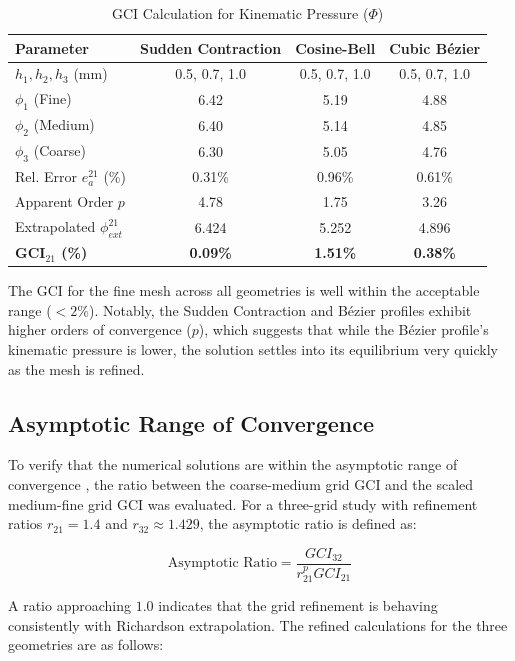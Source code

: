 \documentclass[12pt, a4paper]{article}
\begin{document}
\begin{table}[H]
	\centering
	\caption{GCI Calculation for Kinematic Pressure ($\Phi$)}
	\label{tab:gci_rigorous}
	\begin{tabular}{lccc}
		\toprule
		\textbf{Parameter} & \textbf{Sudden Contraction} & \textbf{Cosine-Bell} & \textbf{Cubic Bézier} \\ \midrule
		$h_1, h_2, h_3$ (mm) & 0.5, 0.7, 1.0 & 0.5, 0.7, 1.0 & 0.5, 0.7, 1.0 \\
		$\phi_1$ (Fine) & 6.42 & 5.19 & 4.88 \\
		$\phi_2$ (Medium) & 6.40 & 5.14 & 4.85 \\
		$\phi_3$ (Coarse) & 6.30 & 5.05 & 4.76 \\
		Rel. Error $e_a^{21}$ (\%) & 0.31\% & 0.96\% & 0.61\% \\
		Apparent Order $p$ & 4.78 & 1.75 & 3.26 \\
		Extrapolated $\phi_{ext}^{21}$ & 6.424 & 5.252 & 4.896 \\
		\textbf{GCI$_{21}$ (\%)} & \textbf{0.09\%} & \textbf{1.51\%} & \textbf{0.38\%} \\ \bottomrule
	\end{tabular}
\end{table}

The GCI for the fine mesh across all geometries is well within the acceptable range ($< 2\%$). Notably, the Sudden Contraction and Bézier profiles exhibit higher orders of convergence ($p$), which suggests that while the Bézier profile's kinematic pressure is lower, the solution settles into its equilibrium very quickly as the mesh is refined.

\subsection{Asymptotic Range of Convergence}
To verify that the numerical solutions are within the asymptotic range of convergence  \cite{celik2008}, the ratio between the coarse-medium grid GCI and the scaled medium-fine grid GCI was evaluated. For a three-grid study with refinement ratios $r_{21} = 1.4$ and $r_{32} \approx 1.429$, the asymptotic ratio is defined as:

\begin{equation}
	\text{Asymptotic Ratio} = \frac{GCI_{32}}{r_{21}^{p} GCI_{21}}
\end{equation}

A ratio approaching $1.0$ indicates that the grid refinement is behaving consistently with Richardson extrapolation. The refined calculations for the three geometries are as follows:
\end{document}

